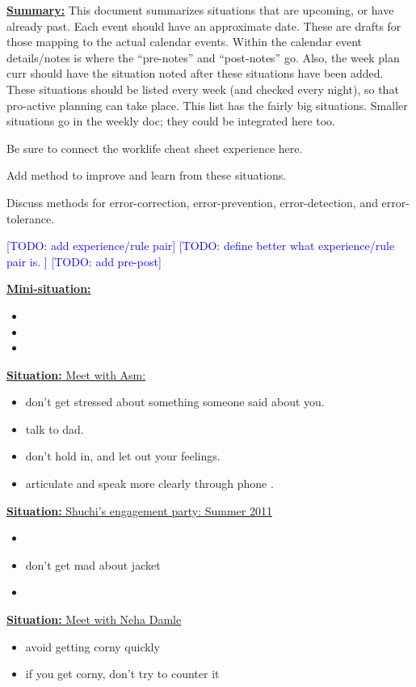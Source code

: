 \documentclass[11pt]{article}
\newcommand{\todo}[1]{\textcolor{blue}{[TODO: #1]}}
\newcommand{\newSituation}[1]{\underline{\textbf{Situation:} #1} }
\newcommand{\newMiniSituation}[1]{\underline{\textbf{Mini-situation:}
    #1} }
\begin{document}
\underline{\textbf{Summary:}} This document summarizes situations
that are upcoming, or have already past. Each event should have an approximate date. These
are drafts for those mapping to the actual calendar events.  Within
the calendar event details/notes is where the ``pre-notes'' and
``post-notes'' go. Also, the week plan curr should have the situation
noted after these situations have been added.  These situations should
be listed every week (and checked every night), so that pro-active
planning can take place. This list has the fairly big
situations. Smaller situations go in the weekly doc; they could be
integrated here too.  

Be sure to connect the worklife cheat sheet experience  here. 

Add method to improve and learn from these situations. 

Discuss methods for error-correction, error-prevention, error-detection, and error-tolerance.

\todo{add experience/rule pair}  
\todo{define better what experience/rule pair is. }
\todo{add pre-post} 


\newMiniSituation{ }
\begin{itemize}
\item 
\item 
\item 
\end{itemize} 

\newSituation{Meet with Asm:} 
\begin{itemize} 
\item don't get stressed about something someone said about you.
\item talk to dad. 
\item don't hold in, and let out your feelings. 
\item articulate and speak more clearly through phone . 
\end{itemize} 

\newSituation{Shuchi's engagement party: Summer 2011} 
\begin{itemize}
\item
\item don't get mad about jacket 
\item
\end{itemize}

\newSituation{Meet with Neha Damle} 
\begin{itemize} 
\item avoid getting corny quickly  
\item if you get corny, don’t try to counter it 
\end{itemize} 
\end{document}
